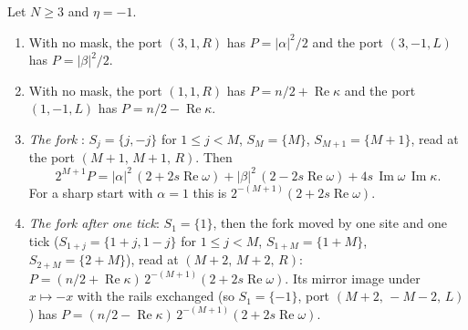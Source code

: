 \begin{proposition}\label{prop:maskread}
Let $N\ge3$ and $\eta=-1$.
\begin{enumerate}[label=(\roman*)]
\item With no mask, the port $(3,1,R)$ has $P=|\alpha|^{2}/2$ and the port $(3,-1,L)$ has $P=|\beta|^{2}/2$.
\item With no mask, the port $(1,1,R)$ has $P=n/2+\operatorname{Re}\kappa$ and the port $(1,-1,L)$ has $P=n/2-\operatorname{Re}\kappa$.
\item \emph{The fork} \cite{dgfour}: $S_j=\{j,-j\}$ for $1\le j<M$, $S_M=\{M\}$, $S_{M+1}=\{M+1\}$, read at the port $(M+1,\,M+1,\,R)$. Then
\[
2^{M+1}P=|\alpha|^{2}\,(2+2s\operatorname{Re}\omega)+|\beta|^{2}\,(2-2s\operatorname{Re}\omega)+4s\,\operatorname{Im}\omega\,\operatorname{Im}\kappa .
\]
For a sharp start with $\alpha=1$ this is $2^{-(M+1)}(2+2s\operatorname{Re}\omega)$.
\item \emph{The fork after one tick}: $S_1=\{1\}$, then the fork moved by one site and one tick ($S_{1+j}=\{1+j,1-j\}$ for $1\le j<M$, $S_{1+M}=\{1+M\}$, $S_{2+M}=\{2+M\}$), read at $(M+2,\,M+2,\,R)$: $P=(n/2+\operatorname{Re}\kappa)\,2^{-(M+1)}(2+2s\operatorname{Re}\omega)$. Its mirror image under $x\mapsto-x$ with the rails exchanged (so $S_1=\{-1\}$, port $(M+2,\,-M-2,\,L)$) has $P=(n/2-\operatorname{Re}\kappa)\,2^{-(M+1)}(2+2s\operatorname{Re}\omega)$.
\end{enumerate}
\end{proposition}

